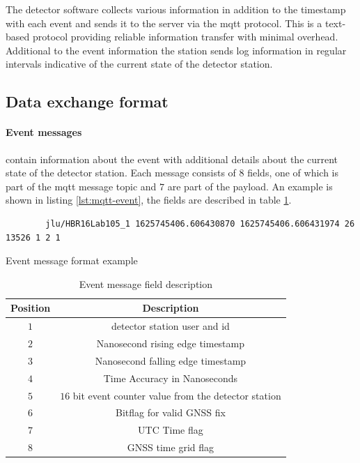 \documentclass[abstract,toc,los,lof,english,10pt,glossary,acronyms]{jluthesis}
\begin{document}
The detector software collects various information in addition to the timestamp with each event and sends it to the server via the \acrfull{mqtt} protocol. This is a text-based protocol providing reliable information transfer with minimal overhead\cite{mqtt}. Additional to the event information the station sends log information in regular intervals indicative of the current state of the detector station.
\subsection{Data exchange format}
\paragraph{Event messages} contain information about the event with additional details about the current state of the detector station. Each message consists of $8$ fields, one of which is part of the \acrshort{mqtt} message topic and $7$ are part of the payload. An example is shown in listing \ref{lst:mqtt-event}, the fields are described in table \ref{tab:event-message}.
\begin{lstfloat}[H]
	\centering
	\begin{verbatim}
		jlu/HBR16Lab105_1 1625745406.606430870 1625745406.606431974 26 13526 1 2 1
	\end{verbatim}
	\caption{Event message format example}
	\label{lst:mqtt-event}
\end{lstfloat}
\begin{table}[H]
	\centering
	\begin{tabular}{| c | c |}
		\hline
		\textbf{Position} & \textbf{Description} \\
		\hline
		$1$ & detector station user and id \\
		\hline
		$2$ & Nanosecond rising edge timestamp \\
		\hline
		$3$ & Nanosecond falling edge timestamp \\
		\hline
		$4$ & Time Accuracy in Nanoseconds \\
		\hline
		$5$ & $16$ bit event counter value from the detector station \\
		\hline
		$6$ & Bitflag for valid GNSS fix \\
		\hline
		$7$ & UTC Time flag \\
		\hline
		$8$ & GNSS time grid flag \\
		\hline
	\end{tabular}
	\caption{Event message field description}
	\label{tab:event-message}
\end{table}
\end{document}
